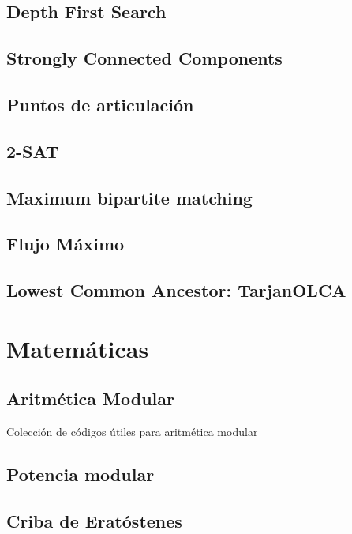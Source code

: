 \documentclass[10pt,letterpaper,twocolumn,twosided]{article}
\newcommand{\codigofuente}[1]{

\dotfill
}
\begin{document}
\subsection{Depth First Search}

\subsection{Strongly Connected Components}

\subsection{Puntos de articulación}

\subsection{2-SAT}

\subsection{Maximum bipartite matching}

\subsection{Flujo Máximo}

\subsection{Lowest Common Ancestor: TarjanOLCA}

\section{Matemáticas}

\subsection{Aritmética Modular}

Colección de códigos útiles para aritmética modular\\
\codigofuente{../src/euclidean.${EXT}}

\subsection{Potencia modular}

\subsection{Criba de Eratóstenes}
\end{document}
